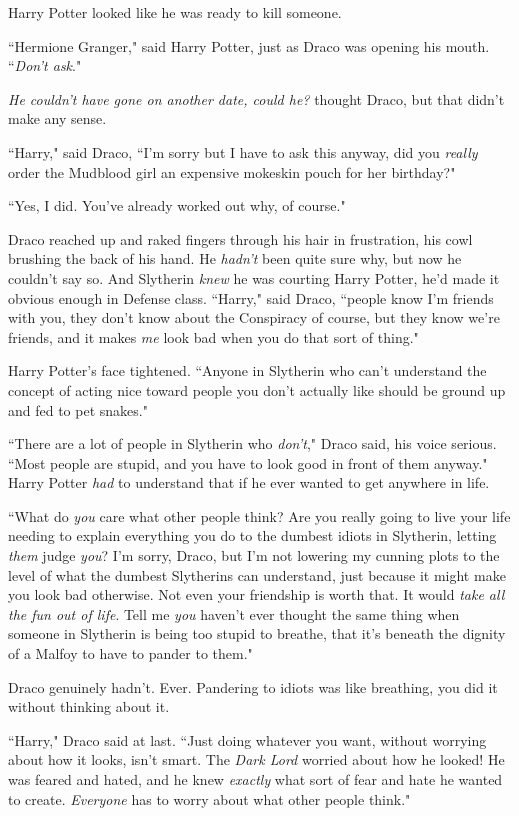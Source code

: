 Harry Potter looked like he was ready to kill someone.

``Hermione Granger," said Harry Potter, just as Draco was opening his mouth. ``\emph{Don't ask}."

\emph{He couldn't have gone on another date, could he?} thought Draco, but that didn't make any sense.

``Harry," said Draco, ``I'm sorry but I have to ask this anyway, did you \emph{really} order the Mudblood girl an expensive mokeskin pouch for her birthday?"

``Yes, I did. You've already worked out why, of course."

Draco reached up and raked fingers through his hair in frustration, his cowl brushing the back of his hand. He \emph{hadn't} been quite sure why, but now he couldn't say so. And Slytherin \emph{knew} he was courting Harry Potter, he'd made it obvious enough in Defense class. ``Harry," said Draco, ``people know I'm friends with you, they don't know about the Conspiracy of course, but they know we're friends, and it makes \emph{me} look bad when you do that sort of thing."

Harry Potter's face tightened. ``Anyone in Slytherin who can't understand the concept of acting nice toward people you don't actually like should be ground up and fed to pet snakes."

``There are a lot of people in Slytherin who \emph{don't}," Draco said, his voice serious. ``Most people are stupid, and you have to look good in front of them anyway." Harry Potter \emph{had} to understand that if he ever wanted to get anywhere in life.

``What do \emph{you} care what other people think? Are you really going to live your life needing to explain everything you do to the dumbest idiots in Slytherin, letting \emph{them} judge \emph{you}? I'm sorry, Draco, but I'm not lowering my cunning plots to the level of what the dumbest Slytherins can understand, just because it might make you look bad otherwise. Not even your friendship is worth that. It would \emph{take all the fun out of life}. Tell me \emph{you} haven't ever thought the same thing when someone in Slytherin is being too stupid to breathe, that it's beneath the dignity of a Malfoy to have to pander to them."

Draco genuinely hadn't. Ever. Pandering to idiots was like breathing, you did it without thinking about it.

``Harry," Draco said at last. ``Just doing whatever you want, without worrying about how it looks, isn't smart. The \emph{Dark Lord} worried about how he looked! He was feared and hated, and he knew \emph{exactly} what sort of fear and hate he wanted to create. \emph{Everyone} has to worry about what other people think."

